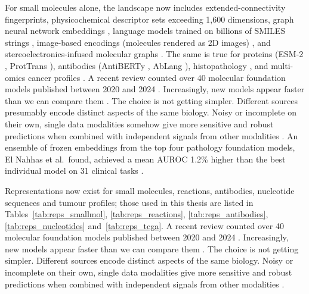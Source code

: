 For small molecules alone, the landscape now includes extended-connectivity fingerprints, physicochemical descriptor sets exceeding 1,600 dimensions, graph neural network embeddings \citep{Yang2019, Fang2022}, language models trained on billions of SMILES strings \citep{ross2022}, image-based encodings (molecules rendered as 2D images) \citep{Zeng2022}, and stereoelectronics-infused molecular graphs \citep{Boiko2025}. The same is true for proteins (ESM-2 \citep{Lin2023}, ProtTrans \citep{Elnaggar2022}), antibodies (AntiBERTy \citep{Ruffolo2021}, AbLang \citep{Olsen2022}), histopathology \citep{ElNahhas2025}, and multi-omics cancer profiles \citep{Steyaert2023}. A recent review counted over 40 molecular foundation models published between 2020 and 2024 \citep{Song2026}. Increasingly, new models appear faster than we can compare them \citep{Bommasani2021}. The choice is not getting simpler. Different sources presumably encode distinct aspects of the same biology. Noisy or incomplete on their own, single data modalities somehow give more sensitive and robust predictions when combined with independent signals from other modalities \citep{Steyaert2023}. An ensemble of frozen embeddings from the top four pathology foundation models, El Nahhas et al.\ found, achieved a mean AUROC 1.2\% higher than the best individual model on 31 clinical tasks \citep{ElNahhas2025}.

Representations now exist for small molecules, reactions, antibodies, nucleotide sequences and tumour profiles; those used in this thesis are listed in Tables~\ref{tab:reps_smallmol}, \ref{tab:reps_reactions}, \ref{tab:reps_antibodies}, \ref{tab:reps_nucleotides} and~\ref{tab:reps_tcga}. A recent review counted over 40 molecular foundation models published between 2020 and 2024 \citep{Song2026}. Increasingly, new models appear faster than we can compare them \citep{Bommasani2021}. The choice is not getting simpler. Different sources encode distinct aspects of the same biology. Noisy or incomplete on their own, single data modalities give more sensitive and robust predictions when combined with independent signals from other modalities \citep{Steyaert2023}.

